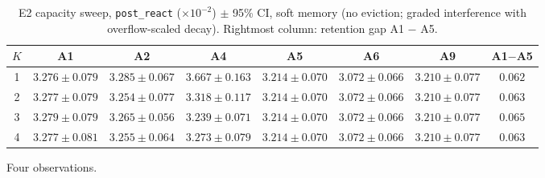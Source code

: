 \begin{table}[h]
\centering
\caption{E2 capacity sweep, \texttt{post\_react} ($\times 10^{-2}$) $\pm$
95\% CI, soft memory (no eviction; graded interference with
overflow-scaled decay). Rightmost column: retention gap A1 $-$ A5.}
\label{tab:dd5-e2-soft}
\small
\begin{tabular}{cccccccc}
\toprule
$K$ & A1 & A2 & A4 & A5 & A6 & A9 & A1$-$A5 \\
\midrule
1 & $3.276 \pm 0.079$ & $3.285 \pm 0.067$ & $3.667 \pm 0.163$ & $3.214 \pm 0.070$ & $3.072 \pm 0.066$ & $3.210 \pm 0.077$ & $0.062$ \\
2 & $3.277 \pm 0.079$ & $3.254 \pm 0.077$ & $3.318 \pm 0.117$ & $3.214 \pm 0.070$ & $3.072 \pm 0.066$ & $3.210 \pm 0.077$ & $0.063$ \\
3 & $3.279 \pm 0.079$ & $3.265 \pm 0.056$ & $3.239 \pm 0.071$ & $3.214 \pm 0.070$ & $3.072 \pm 0.066$ & $3.210 \pm 0.077$ & $0.065$ \\
4 & $3.277 \pm 0.081$ & $3.255 \pm 0.064$ & $3.273 \pm 0.079$ & $3.214 \pm 0.070$ & $3.072 \pm 0.066$ & $3.210 \pm 0.077$ & $0.063$ \\
\bottomrule
\end{tabular}
\end{table}

Four observations.

